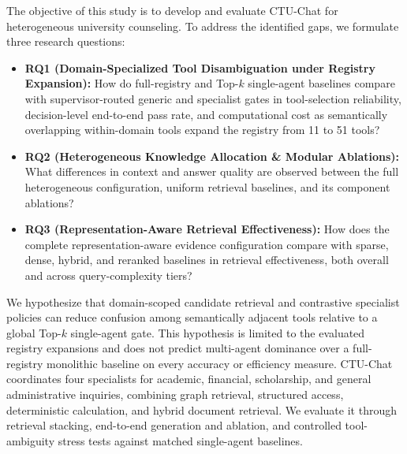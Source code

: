 The objective of this study is to develop and evaluate CTU-Chat for heterogeneous university counseling. To address the identified gaps, we formulate three research questions:
\begin{itemize}
    \setlength{\itemsep}{1.5pt}
    \setlength{\parsep}{0pt}
    \setlength{\parskip}{0pt}

    \item \textbf{RQ1 (Domain-Specialized Tool Disambiguation under Registry Expansion):}
    How do full-registry and Top-$k$ single-agent baselines compare with supervisor-routed generic and specialist gates in tool-selection reliability, decision-level end-to-end pass rate, and computational cost as semantically overlapping within-domain tools expand the registry from 11 to 51 tools?

    \item \textbf{RQ2 (Heterogeneous Knowledge Allocation \& Modular Ablations):}
    What differences in context and answer quality are observed between the full heterogeneous configuration, uniform retrieval baselines, and its component ablations?

    \item \textbf{RQ3 (Representation-Aware Retrieval Effectiveness):}
    How does the complete representation-aware evidence configuration compare with sparse, dense, hybrid, and reranked baselines in retrieval effectiveness, both overall and across query-complexity tiers?
\end{itemize}

We hypothesize that domain-scoped candidate retrieval and contrastive specialist policies can reduce confusion among semantically adjacent tools relative to a global Top-$k$ single-agent gate. This hypothesis is limited to the evaluated registry expansions and does not predict multi-agent dominance over a full-registry monolithic baseline on every accuracy or efficiency measure. CTU-Chat coordinates four specialists for academic, financial, scholarship, and general administrative inquiries, combining graph retrieval, structured access, deterministic calculation, and hybrid document retrieval. We evaluate it through retrieval stacking, end-to-end generation and ablation, and controlled tool-ambiguity stress tests against matched single-agent baselines.

